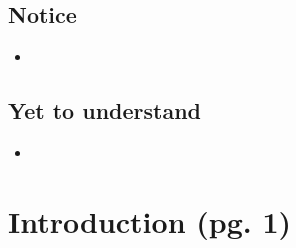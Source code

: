 \documentclass{article}
\begin{document}
\subsection{Notice}

    \begin{itemize}

    \item 
    
    \end{itemize}

\subsection{Yet to understand}

    \begin{itemize}

    \item 
    
    \end{itemize}

\section{Introduction (pg. 1)}
\end{document}
